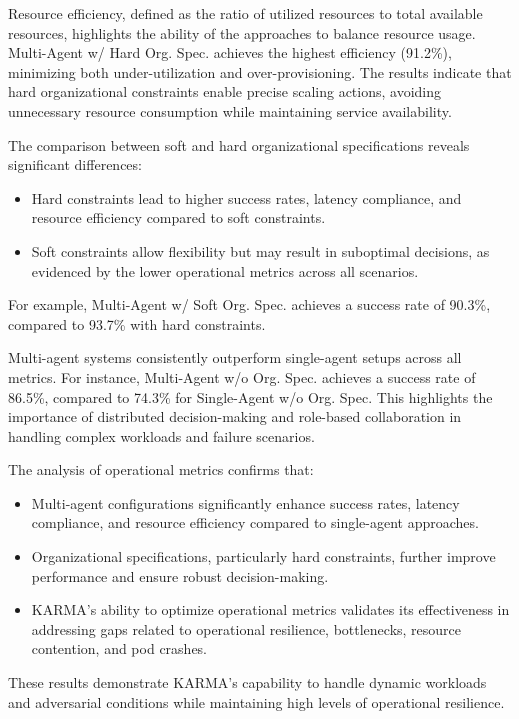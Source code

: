 \documentclass[conference]{IEEEtran}
\begin{document}
Resource efficiency, defined as the ratio of utilized resources to total available resources, highlights the ability of the approaches to balance resource usage. Multi-Agent w/ Hard Org. Spec. achieves the highest efficiency (91.2\%), minimizing both under-utilization and over-provisioning. The results indicate that hard organizational constraints enable precise scaling actions, avoiding unnecessary resource consumption while maintaining service availability.

The comparison between soft and hard organizational specifications reveals significant differences:
\begin{itemize}
    \item Hard constraints lead to higher success rates, latency compliance, and resource efficiency compared to soft constraints.
    \item Soft constraints allow flexibility but may result in suboptimal decisions, as evidenced by the lower operational metrics across all scenarios.
\end{itemize}
For example, Multi-Agent w/ Soft Org. Spec. achieves a success rate of 90.3\%, compared to 93.7\% with hard constraints.

Multi-agent systems consistently outperform single-agent setups across all metrics. For instance, Multi-Agent w/o Org. Spec. achieves a success rate of 86.5\%, compared to 74.3\% for Single-Agent w/o Org. Spec. This highlights the importance of distributed decision-making and role-based collaboration in handling complex workloads and failure scenarios.

The analysis of operational metrics confirms that:
\begin{itemize}
    \item Multi-agent configurations significantly enhance success rates, latency compliance, and resource efficiency compared to single-agent approaches.
    \item Organizational specifications, particularly hard constraints, further improve performance and ensure robust decision-making.
    \item KARMA's ability to optimize operational metrics validates its effectiveness in addressing gaps related to operational resilience, bottlenecks, resource contention, and pod crashes.
\end{itemize}
These results demonstrate KARMA's capability to handle dynamic workloads and adversarial conditions while maintaining high levels of operational resilience.

\end{document}
